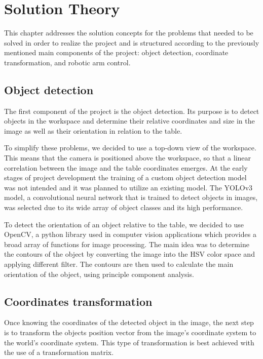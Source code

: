 
\chapter{Solution Theory} %
\label{theory} %


This chapter addresses the solution concepts for the problems that needed to be solved in order to realize the project and is structured according to the previously mentioned main components of the project: object detection, coordinate transformation, and robotic arm control. 
 
\section{Object detection}
The first component of the project is the object detection. Its purpose is to detect objects in the workspace and determine their relative coordinates and size in the image as well as their orientation in relation to the table. 

To simplify these problems, we decided to use a top-down view of the workspace. This means that the camera is positioned above the workspace, so that a linear correlation between the image and the table coordinates emerges. At the early stages of project development the training of a custom object detection model was not intended and it was planned to utilize an existing model. The YOLOv3 model, a convolutional neural network that is trained to detect objects in images, was selected due to its wide array of object classes and its high performance.

To detect the orientation of an object relative to the table, we decided to use OpenCV, a python library used in computer vision applications which provides a broad array of functions for image processing. The main idea was to determine the contours of the object by converting the image into the HSV color space and applying different filter. The contours are then used to calculate the main orientation of the object, using principle component analysis. 

\section{Coordinates transformation}

Once knowing the coordinates of the detected object in the image, 
the next step is to transform the objects position vector from the image's coordinate system to the world's coordinate system. This type of transformation is best achieved with the use of a transformation matrix.

